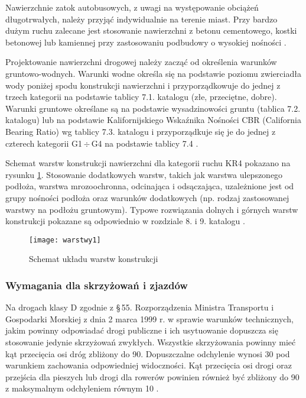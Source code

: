 \documentclass[twoside,12pt]{article}
\begin{document}
	Nawierzchnie zatok autobusowych, z uwagi na występowanie obciążeń długotrwałych, należy przyjąć indywidualnie na terenie miast. Przy bardzo dużym ruchu zalecane jest stosowanie nawierzchni z betonu cementowego, kostki betonowej lub kamiennej przy zastosowaniu podbudowy o wysokiej nośności \cite{knd_podatne}.
	
	Projektowanie nawierzchni drogowej należy zacząć od określenia warunków gruntowo-wodnych. Warunki wodne określa się na podstawie poziomu zwierciadła wody poniżej spodu konstrukcji nawierzchni i przyporządkowuje do jednej z trzech kategorii na podstawie tablicy 7.1. katalogu (złe, przeciętne, dobre). Warunki gruntowe określane są na podstawie wysadzinowości gruntu (tablica 7.2. katalogu) lub na podstawie Kalifornijskiego Wskaźnika Nośności CBR (California Bearing Ratio) wg tablicy 7.3. katalogu i przyporządkuje się je do jednej z czterech kategorii G1\,$\div$\,G4 na podstawie tablicy 7.4 \cite{knd_podatne}. 
	
	Schemat warstw konstrukcji nawierzchni dla kategorii ruchu KR4 pokazano na rysunku \ref{drogi5}. Stosowanie dodatkowych warstw, takich jak warstwa ulepszonego podłoża, warstwa mrozoochronna, odcinająca i odsączająca, uzależnione jest od grupy nośności podłoża oraz warunków dodatkowych (np. rodzaj zastosowanej warstwy na podłożu gruntowym). Typowe rozwiązania dolnych i górnych warstw konstrukcji pokazane są odpowiednio w rozdziale 8. i 9. katalogu \cite{knd_podatne}.
		\begin{figure}[H]
		\centering
		\texttt{[image: warstwy1]}\\
		\caption{Schemat układu warstw konstrukcji}
		\label{drogi5}
	\end{figure}	
	
	
	
		
	\subsubsection{Wymagania dla skrzyżowań i zjazdów}
	
	Na drogach klasy D zgodnie z §\,55. Rozporządzenia Ministra Transportu i Gospodarki Morskiej z dnia 2 marca 1999 r. w sprawie warunków technicznych, jakim powinny odpowiadać drogi publiczne i ich usytuowanie dopuszcza się stosowanie jedynie skrzyżowań zwykłych. Wszystkie skrzyżowania powinny mieć kąt przecięcia osi dróg zbliżony do 90\textdegree. Dopuszczalne odchylenie wynosi 30\textdegree{} pod warunkiem zachowania odpowiedniej widoczności. Kąt przecięcia osi drogi oraz przejścia dla pieszych lub drogi dla rowerów powinien również być zbliżony do 90\textdegree{} z maksymalnym odchyleniem równym 10\textdegree{} \cite{rozporzadzenie_drogi}.
	
\end{document}
